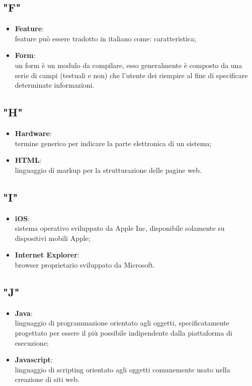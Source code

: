 \subsection{"F"}
\begin{itemize}
\item \textbf{Feature}:\\ feature può essere tradotto in italiano come: caratteristica;
\item \textbf{Form}:\\ un form è un modulo da compilare, esso generalmente è composto da una serie di campi (testuali e non) che l'utente dei riempire al fine di specificare determinate informazioni.
\end{itemize}

\subsection{"H"}
\begin{itemize}
\item \textbf{Hardware}:\\ termine generico per indicare la parte elettronica di un sistema;
\item \textbf{HTML}:\\ linguaggio di markup per la strutturazione delle pagine web.
\end{itemize}

\subsection{"I"}
\begin{itemize}
\item \textbf{iOS}:\\ sistema operativo sviluppato da Apple Inc, disponibile solamente su dispositivi mobili Apple;
\item \textbf{Internet Explorer}:\\ browser proprietario sviluppato da Microsoft.
\end{itemize}

\subsection{"J"}
\begin{itemize}
\item \textbf{Java}:\\ linguaggio di programmazione orientato agli oggetti, specificatamente progettato per essere il più possibile indipendente dalla piattaforma di esecuzione;
\item \textbf{Javascript}:\\ linguaggio di scripting orientato agli oggetti comunemente usato nella creazione di siti web.
\end{itemize}

